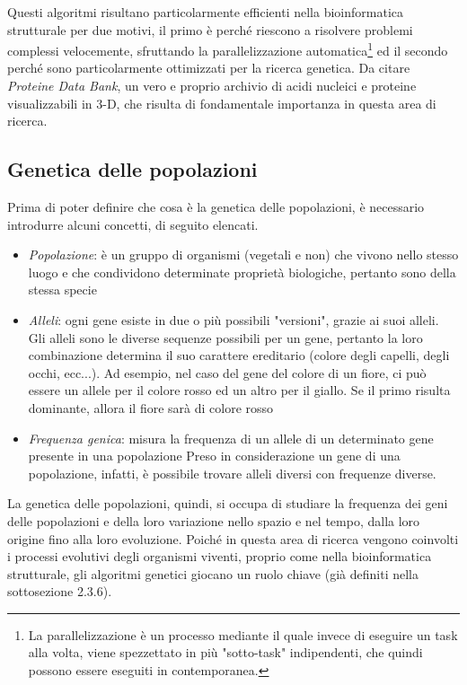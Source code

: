 \newline
Questi algoritmi risultano particolarmente efficienti nella bioinformatica strutturale per due motivi, il primo è perché riescono a risolvere problemi complessi velocemente, sfruttando la parallelizzazione automatica\footnote{La parallelizzazione è un processo mediante il quale invece di eseguire un task alla volta, viene spezzettato in più "sotto-task" indipendenti, che quindi possono essere eseguiti in contemporanea.} ed il secondo perché sono particolarmente ottimizzati per la ricerca genetica.
\newline
Da citare \textit{Proteine Data Bank}\cite{proteineDataBank}, un vero e proprio archivio di acidi nucleici e proteine visualizzabili in 3-D, che risulta di fondamentale importanza in questa area di ricerca.

\subsection{Genetica delle popolazioni}
Prima di poter definire che cosa è la genetica delle popolazioni, è necessario introdurre alcuni concetti, di seguito elencati.
\begin{itemize}
	\item \textit{Popolazione}: è un gruppo di organismi (vegetali e non) che vivono nello stesso luogo e che condividono determinate proprietà biologiche, pertanto sono della stessa specie
	\item \textit{Alleli}: ogni gene esiste in due o più possibili "versioni", grazie ai suoi alleli. Gli alleli sono le diverse sequenze possibili per un gene, pertanto la loro combinazione determina il suo carattere ereditario (colore degli capelli, degli occhi, ecc...). Ad esempio, nel caso del gene del colore di un fiore, ci può essere un allele per il colore rosso ed un altro per il giallo. Se il primo risulta dominante, allora il fiore sarà di colore rosso
	\item \textit{Frequenza genica}: misura la frequenza di un allele di un determinato gene presente in una popolazione
	\newline
	Preso in considerazione un gene di una popolazione, infatti, è possibile trovare alleli diversi con frequenze diverse.
\end{itemize}
La genetica delle popolazioni, quindi, si occupa di studiare la frequenza dei geni delle popolazioni e della loro variazione nello spazio e nel tempo, dalla loro origine fino alla loro evoluzione.
\newline
Poiché in questa area di ricerca vengono coinvolti i processi evolutivi degli organismi viventi, proprio come nella bioinformatica strutturale, gli algoritmi genetici giocano un ruolo chiave (già definiti nella sottosezione 2.3.6). 
